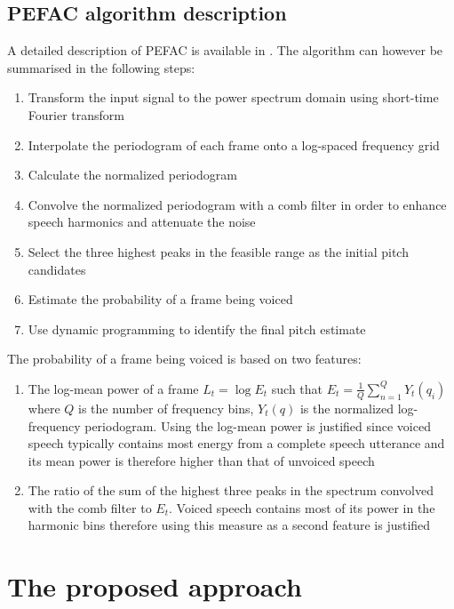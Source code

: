 \subsection{PEFAC algorithm description}

A detailed description of PEFAC is available in \cite{PEFAC}. The algorithm can however be summarised in the following steps:
\begin{enumerate}
\item Transform the input signal to the power spectrum domain using short-time Fourier transform
\item Interpolate the periodogram of each frame onto a log-spaced frequency grid
\item Calculate the normalized periodogram
\item Convolve the normalized periodogram with a comb filter in order to enhance speech harmonics and attenuate the noise
\item Select the three highest peaks in the feasible range as the initial pitch candidates
\item Estimate the probability of a frame being voiced
\item Use dynamic programming to identify the final pitch estimate
\end{enumerate}

The probability of a frame being voiced is based on two features:
\begin{enumerate}
\item The log-mean power of a frame $L_t = \log E_t$ such that $E_t = \frac{1}{Q} \sum_{n=1}^{Q} Y_t(q_i)$ where $Q$ is the number of frequency bins, $Y_t(q)$ is the normalized log-frequency periodogram. Using the log-mean power is justified since voiced speech typically contains most energy from a complete speech utterance and its mean power is therefore higher than that of unvoiced speech
\item The ratio of the sum of the highest three peaks in the spectrum convolved with the comb filter to $E_t$. Voiced speech contains most of its power in the harmonic bins therefore using this measure as a second feature is justified
\end{enumerate}


\section{The proposed approach}

